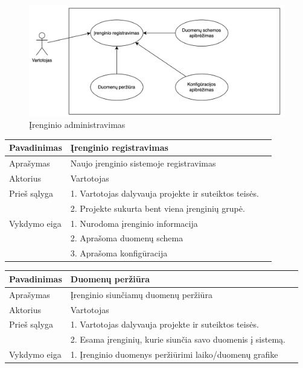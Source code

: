 \documentclass{VUMIFInfBakalaurinis}
\begin{document}
\begin{figure}[H]
  \centering
  \includegraphics[scale=0.7]{img/UC-devices}
  \caption{Įrenginio administravimas}
  \label{img:mlp}
\end{figure}

%
%
\begin{tabular}{  l  p{10cm}  p{15cm} }

\toprule
\textbf{Pavadinimas}
& \textbf{Įrenginio registravimas} \\
\midrule

Aprašymas
& Naujo įrenginio sistemoje registravimas \\

\hline
Aktorius    
& Vartotojas \\

\hline
Prieš sąlyga
& 1. Vartotojas dalyvauja projekte ir suteiktos teisės. \\
& 2. Projekte sukurta bent viena įrenginių grupė. \\

\hline
Vykdymo eiga    
& 1. Nurodoma įrenginio informacija \\
& 2. Aprašoma duomenų schema \\
& 3. Aprašoma konfigūracija \\
\bottomrule
\end{tabular}
  
\hfill \break

%
%
\begin{tabular}{  l  p{10cm}  p{15cm} }

\toprule
\textbf{Pavadinimas}
& \textbf{Duomenų peržiūra} \\
\midrule

Aprašymas
& Įrenginio siunčiamų duomenų peržiūra \\

\hline
Aktorius    
& Vartotojas \\

\hline
Prieš sąlyga
& 1. Vartotojas dalyvauja projekte ir suteiktos teisės. \\
& 2. Esama įrenginių, kurie siunčia savo duomenis į sistemą. \\

\hline
Vykdymo eiga    
& 1. Įrenginio duomenys peržiūrimi laiko/duomenų grafike \\
\bottomrule
\end{tabular}
  
\end{document}

